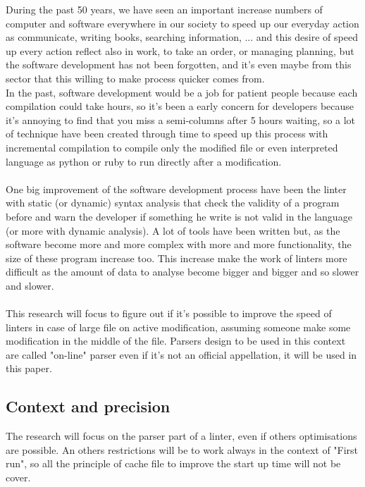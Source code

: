 During the past 50 years, we have seen an important increase numbers of computer and software everywhere in our society to speed up our everyday action as communicate, writing books, searching information, ... and this desire of speed up every action reflect also in work, to take an order, or managing planning, but the software development has not been forgotten, and it's even maybe from this sector that this willing to make process quicker comes from.
\\
In the past, software development would be a job for patient people because each compilation could take hours, so it's been a early concern for developers because it's annoying to find that you miss a semi-columns after 5 hours waiting, so a lot of technique have been created through time to speed up this process with incremental compilation to compile only the modified file or even interpreted language as python or ruby to run directly after a modification.
\\
\\
One big improvement of the software development process have been the linter with static (or dynamic) syntax analysis that check the validity of a program before and warn the developer if something he write is not valid in the language (or more with dynamic analysis). A lot of tools have been written but, as the software become more and more complex with more and more functionality, the size of these program increase too. This increase make the work of linters more difficult as the amount of data to analyse become bigger and bigger and so slower and slower.
\\
\\
This research will focus to figure out if it's possible to improve the speed of linters in case of large file on active modification, assuming someone make some modification in the middle of the file. Parsers design to be used in this context are called "on-line" parser even if it's not an official appellation, it will be used in this paper.
\\
\subsection{Context and precision}
The research will focus on the parser part of a linter, even if others optimisations are possible.
An others restrictions will be to work always in the context of "First run", so all the principle of cache file to improve the start up time will not be cover. 
